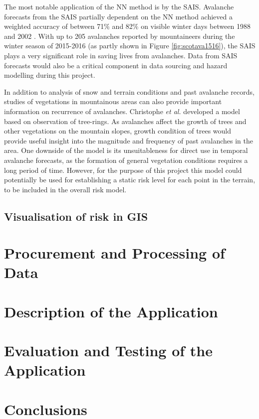 \documentclass[openany]{UoYCSproject}
\begin{document}
The most notable application of the NN method is by the SAIS. Avalanche forecasts from the SAIS partially dependent on the NN method achieved a weighted accuracy of between 71\% and 82\% on visible winter days between 1988 and 2002 \cite[p. 351] {Purves2003343}. With up to 205 avalanches reported by mountaineers during the winter season of 2015-2016 \cite{sais} (as partly shown in Figure \ref{fig:scotava1516}), the SAIS plays a very significant role in saving lives from avalanches. Data from SAIS forecasts would also be a critical component in data sourcing and hazard modelling during this project.

In addition to analysis of snow and terrain conditions and past avalanche records, studies of vegetations in mountainous areas can also provide important information on recurrence of avalanches. Christophe \textit{et al.} \cite{Christophe2010107} developed a model based on observation of tree-rings. As avalanches affect the growth of trees and other vegetations on the mountain slopes, growth condition of trees would provide useful insight into the magnitude and frequency of past avalanches in the area. One downside of the model is its unsuitableness for direct use in temporal avalanche forecasts, as the formation of general vegetation conditions requires a long period of time. However, for the purpose of this project this model could potentially be used for establishing a static risk level for each point in the terrain, to be included in the overall risk model.

\section{Visualisation of risk in GIS}


 
\chapter{Procurement and Processing of Data} \label{ch:data}

\chapter{Description of the Application} \label{ch:app-description}

\chapter{Evaluation and Testing of the Application} \label{ch:app-testing}

\chapter{Conclusions} \label{ch:conclusions}

\small{}
\end{document}
